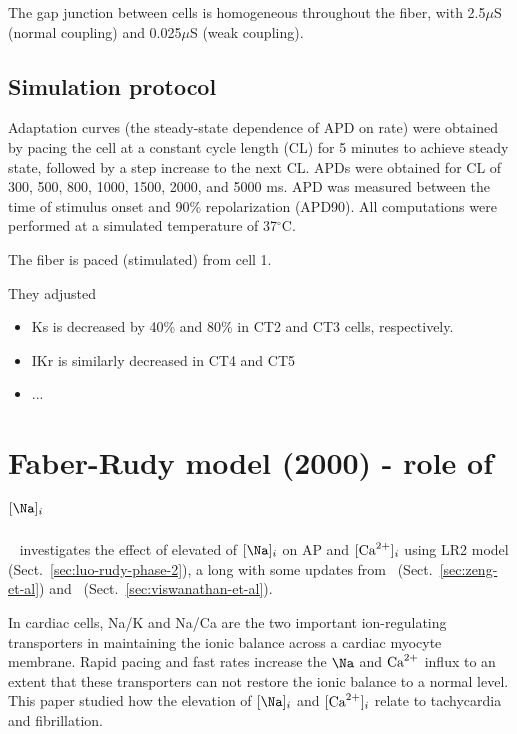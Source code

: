 The gap junction between cells is homogeneous throughout the fiber,
with 2.5$\mu$S (normal coupling) and 0.025$\mu$S (weak coupling). 

\subsection{Simulation protocol}
\label{sec:simulation-protocol}


Adaptation curves (the steady-state dependence of APD on rate) were
obtained by pacing the cell at a constant cycle length (CL) for 5
minutes to achieve steady state, followed by a step increase to the
next CL. APDs were obtained for CL of 300, 500, 800, 1000, 1500, 2000,
and 5000 ms. APD was measured between the time of stimulus onset and
90\% repolarization (APD90). All computations were performed at a
simulated temperature of 37$^\circ$C.

The fiber is paced (stimulated) from cell 1. 


They adjusted 
\begin{itemize}
\item Ks is decreased by 40\% and 80\% in CT2 and CT3 cells,
  respectively. 

\item IKr is similarly decreased in CT4 and CT5

\item ...

\end{itemize}

\section{Faber-Rudy model (2000) - role of $[\Na]_i$}
\label{sec:faber-rudy-model}


~\citep{faber2000} investigates the effect of elevated of $[\Na]_i$ on
AP and $[{\text{Ca}^{2+}}]_i$ using LR2 model (Sect.~\ref{sec:luo-rudy-phase-2}), a
long with some updates from~\citep{zeng1995}
(Sect.~\ref{sec:zeng-et-al}) and~\citep{viswanathan1999}
(Sect.~\ref{sec:viswanathan-et-al}).

In cardiac cells, Na/K and Na/Ca are the two important ion-regulating
transporters in maintaining the ionic balance across a cardiac
myocyte membrane. Rapid pacing and fast rates increase the $\Na$ and
${\text{Ca}^{2+}}$ influx to an extent that these transporters can not restore the
ionic balance to a normal level.  This paper studied how the elevation
of $[\Na]_i$ and $[{\text{Ca}^{2+}}]_i$ relate to tachycardia and fibrillation. 

